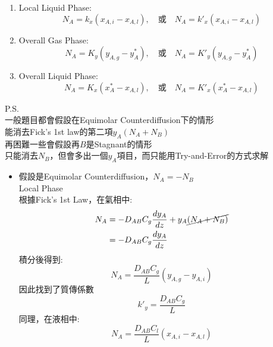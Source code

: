 \documentclass[../main.tex]{subfiles}
\begin{document}
\begin{itemize}
\begin{enumerate}
\begin{equation}
      \end{equation}
    \item Local Liquid Phase:
      \begin{equation}
        N_A = k_x\left(x_{A,i}-x_{A,l}\right), \quad \text{或}\quad N_A = k'_x\left(x_{A,i}-x_{A,l}\right)
      \end{equation}
    \item Overall Gas Phase:
      \begin{equation}
        N_A = K_y\left(y_{A,g}-y_A^\ast\right), \quad \text{或}\quad N_A = K'_y\left(y_{A,g}-y_A^\ast\right)
      \end{equation}
    \item Overall Liquid Phase:
      \begin{equation}
        N_A = K_x\left(x_A^\ast-x_{A,l}\right), \quad \text{或}\quad N_A = K'_x\left(x_A^\ast-x_{A,l}\right)
      \end{equation}
  \end{enumerate}
  P.S. \\
  一般題目都會假設在Equimolar Counterdiffusion下的情形\\
  能消去Fick's 1st law的第二項$y_A(N_A+N_B)$\\
  再困難一些會假設再$B$是Stagnant的情形\\
  只能消去$N_B$，但會多出一個$y_A$項目，而只能用Try-and-Error的方式求解
  \begin{itemize}
    \item 假設是Equimolar Counterdiffusion，$N_A=-N_B$\\
      Local Phase\\
      根據Fick's 1st Law，在氣相中:
      \begin{align}
        N_A &= -D_{AB}C_g\frac{dy_A}{dz}+y_A\cancel{\left(N_A+N_B\right)} \nonumber\\
        &= -D_{AB}C_g\frac{dy_A}{dz}
      \end{align}
      積分後得到:
      \begin{equation}
        N_A = \frac{D_{AB}C_g}{L}\left(y_{A,g}-y_{A,i}\right)
      \end{equation}
      因此找到了質傳係數
      \begin{equation}
        \boxed{k'_y = \frac{D_{AB}C_g}{L}}
      \end{equation}
      同理，在液相中:
      \begin{equation}
        N_A = \frac{D_{AB}C_l}{L}\left(x_{A,i}-x_{A,l}\right)
      \end{equation}

\end{itemize}
\end{itemize}
\end{document}
